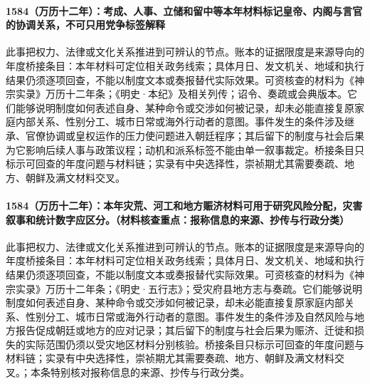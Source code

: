 \paragraph{1584（万历十二年）：考成、人事、立储和留中等本年材料标记皇帝、内阁与言官的协调关系，不可只用党争标签解释} 此事把权力、法律或文化关系推进到可辨认的节点。账本的证据限度是来源导向的年度桥接条目：本年材料可定位相关政务线索；具体月日、发文机关、地域和执行结果仍须逐项回查，不能以制度文本或奏报替代实际效果。可资核查的材料为《神宗实录》万历十二年条；《明史·本纪》及相关列传；诏令、奏疏或会典版本。它们能够说明制度如何表述自身、某种命令或交涉如何被记录，却未必能直接复原家庭内部关系、性别分工、城市日常或海外行动者的意图。事件发生的条件涉及继承、官僚协调或皇权运作的压力使问题进入朝廷程序；其后留下的制度与社会后果为它影响后续人事与政策议程；动机和派系标签不能由单一叙事裁定。桥接条目只标示可回查的年度问题与材料链；实录有中央选择性，崇祯期尤其需要奏疏、地方、朝鲜及满文材料交叉。

\paragraph{1584（万历十二年）：本年灾荒、河工和地方赈济材料可用于研究风险分配，灾害叙事和统计数字应区分。（材料核查重点：报称信息的来源、抄传与行政分类）} 此事把权力、法律或文化关系推进到可辨认的节点。账本的证据限度是来源导向的年度桥接条目：本年材料可定位相关政务线索；具体月日、发文机关、地域和执行结果仍须逐项回查，不能以制度文本或奏报替代实际效果。可资核查的材料为《神宗实录》万历十二年条；《明史·五行志》；受灾府县地方志与奏疏。它们能够说明制度如何表述自身、某种命令或交涉如何被记录，却未必能直接复原家庭内部关系、性别分工、城市日常或海外行动者的意图。事件发生的条件涉及自然风险与地方报告促成朝廷或地方的应对记录；其后留下的制度与社会后果为赈济、迁徙和损失的实际范围仍须以受灾地区材料分别核验。桥接条目只标示可回查的年度问题与材料链；实录有中央选择性，崇祯期尤其需要奏疏、地方、朝鲜及满文材料交叉。；本条特别核对报称信息的来源、抄传与行政分类。
